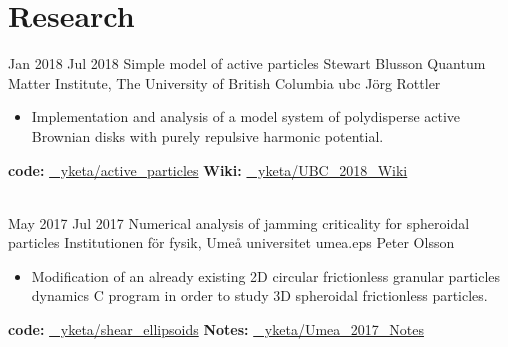 \documentclass[letterpaper]{cvtemplate_en} %
\begin{document}
\makeprofile %


\section{Research}

\begin{cvbody}

\cvitem
	{Jan 2018}
	{Jul 2018}
  {Simple model of active particles}
  {Stewart Blusson Quantum Matter Institute, The University of British Columbia }
  {ubc}
  {J\"org Rottler}
  {\begin{itemize}
  \item Implementation and analysis of a model system of polydisperse active Brownian disks with purely repulsive harmonic potential.\\
  \end{itemize}
  {\bf code:} \href{https://github.com/yketa/active_particles}{\faGithub~ yketa/active\_particles} \hfill {\bf Wiki:} \href{https://github.com/yketa/UBC_2018_Wiki}{\faGithub~ yketa/UBC\_2018\_Wiki}
  }
  \\

\cvitem
	{May 2017}
	{Jul 2017}
	{Numerical analysis of jamming criticality for spheroidal particles}
	{Institutionen f\"{o}r fysik, Ume\r{a} universitet }
	{umea.eps}
	{Peter Olsson}
	{\begin{itemize}
	\item Modification of an already existing 2D circular frictionless granular particles dynamics C
program in order to study 3D spheroidal frictionless particles.\\
	\end{itemize}
	{\bf code:} \href{https://github.com/yketa/shear_ellipsoids}{\faGithub~ yketa/shear\_ellipsoids} \hfill {\bf Notes:} \href{https://github.com/yketa/Umea_2017_Notes}{\faGithub~ yketa/Umea\_2017\_Notes}
	}
  \\


\end{cvbody}
\end{document}
